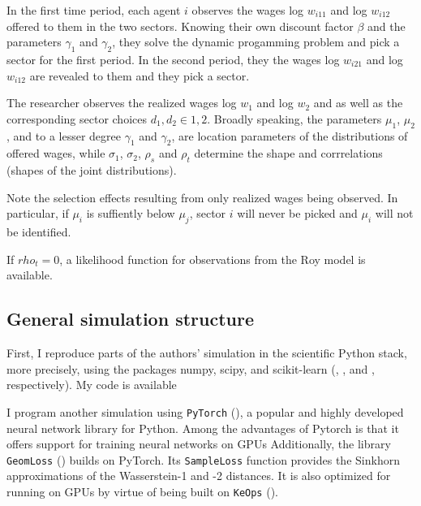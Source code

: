 In the first time period, each agent $i$ observes the wages log $w_{i11}$ and log $w_{i12}$ offered to them in the two sectors.
Knowing their own discount factor $\beta$ and the parameters $\gamma_1$ and $\gamma_2$, they solve the dynamic progamming problem
and pick a sector for the first period.
In the second period, they the wages log $w_{i21}$ and log $w_{i12}$ are revealed to them and they pick a sector. %

The researcher observes the realized wages log $w_1$ and log $w_2$ and as well as the corresponding sector choices $d_1, d_2 \in {1, 2}$.
Broadly speaking, the parameters $\mu_1$, $\mu_2$, and to a lesser degree $\gamma_1$ and $\gamma_2$, are location parameters of the distributions of offered wages,
while $\sigma_1$, $\sigma_2$, $\rho_s$ and $\rho_t$ determine the shape and corrrelations (shapes of the joint distributions). %

Note the selection effects resulting from only realized wages being observed.
In particular, if $\mu_i$ is suffiently below $\mu_j$, sector $i$ will never be picked and $\mu_i$ will not be identified.

If $rho_t = 0$, a likelihood function for observations from the Roy model is available.

\subsection{General simulation structure}
\label{sec:general_simulation_structure}

First, I reproduce parts of the authors' simulation in the scientific Python stack, more precisely, using the packages numpy, scipy, and scikit-learn (\textcite{harris2020array}, \textcite{2020SciPy-NMeth}, and \textcite{scikit-learn}, respectively).
My code is available %

I program another simulation using \texttt{PyTorch} (\cite{Ansel_PyTorch_2_Faster_2024}), a popular and highly developed neural network library for Python.
Among the advantages of Pytorch is that it offers support for training neural networks on GPUs %
Additionally, the library \texttt{GeomLoss} (\cite{feydy2019interpolating}) builds on PyTorch. 
Its \texttt{SampleLoss} function provides the Sinkhorn approximations of the Wasserstein-1 and -2 distances.
It is also optimized for running on GPUs by virtue of being built on \texttt{KeOps} (\cite{KeOps}).

